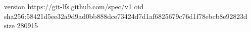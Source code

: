 version https://git-lfs.github.com/spec/v1
oid sha256:58421d5ee32a9d9ad0bb888dce73424d7d1af6825679c76d1f78ebcb8e92823d
size 280915
